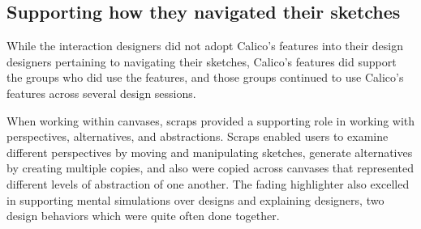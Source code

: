 

\subsection{Supporting how they navigated their sketches}

While the interaction designers did not adopt Calico's features into their design designers pertaining to navigating their sketches, Calico's features did support the groups who did use the features, and those groups continued to use Calico's features across several design sessions. 

When working within canvases, scraps provided a supporting role in working with perspectives, alternatives, and abstractions. Scraps enabled users to examine different perspectives by moving and manipulating sketches, generate alternatives by creating multiple copies, and also were copied across canvases that represented different levels of abstraction of one another. The fading highlighter also excelled in supporting mental simulations over designs and explaining designers, two design behaviors which were quite often done together.

